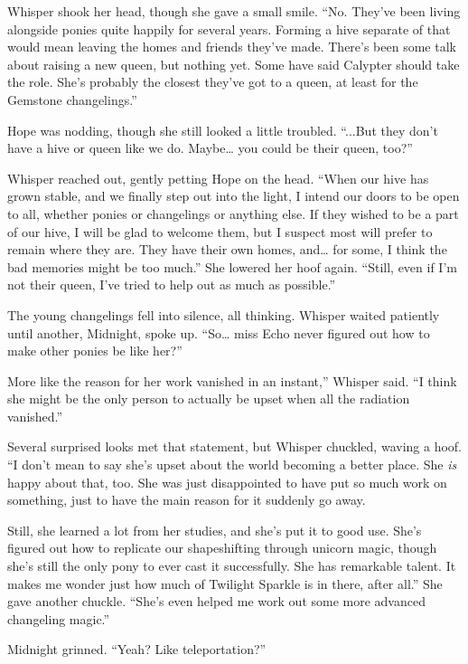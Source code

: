 Whisper shook her head, though she gave a small smile. “No. They’ve been living alongside ponies quite happily for several years. Forming a hive separate of that would mean leaving the homes and friends they’ve made. There’s been some talk about raising a new queen, but nothing yet. Some have said Calypter should take the role. She’s probably the closest they’ve got to a queen, at least for the Gemstone changelings.”

Hope was nodding, though she still looked a little troubled. “...But they don’t have a hive or queen like we do. Maybe… you could be their queen, too?”

Whisper reached out, gently petting Hope on the head. “When our hive has grown stable, and we finally step out into the light, I intend our doors to be open to all, whether ponies or changelings or anything else. If they wished to be a part of our hive, I will be glad to welcome them, but I suspect most will prefer to remain where they are. They have their own homes, and… for some, I think the bad memories might be too much.” She lowered her hoof again. “Still, even if I’m not their queen, I’ve tried to help out as much as possible.”

The young changelings fell into silence, all thinking. Whisper waited patiently until another, Midnight, spoke up. “So… miss Echo never figured out how to make other ponies be like her?”

\leavevmode{}More like the reason for her work vanished in an instant,” Whisper said. “I think she might be the only person to actually be upset when all the radiation vanished.”

Several surprised looks met that statement, but Whisper chuckled, waving a hoof. “I don’t mean to say she’s upset about the world becoming a better place. She \textit{is} happy about that, too. She was just disappointed to have put so much work on something, just to have the main reason for it suddenly go away.

\leavevmode{}Still, she learned a lot from her studies, and she’s put it to good use. She’s figured out how to replicate our shapeshifting through unicorn magic, though she’s still the only pony to ever cast it successfully. She has remarkable talent. It makes me wonder just how much of Twilight Sparkle is in there, after all.” She gave another chuckle. “She’s even helped me work out some more advanced changeling magic.”

Midnight grinned. “Yeah? Like teleportation?”


